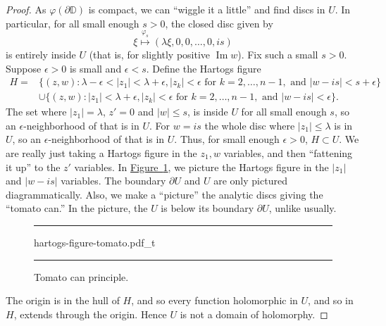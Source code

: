\documentclass[12pt,openany]{book}
\renewcommand{\Im}{\operatorname{Im}}
\newcommand{\sabs}[1]{\lvert {#1} \rvert}
\newcommand{\D}{{\mathbb{D}}}
\theoremstyle{plain}
\theoremstyle{remark}
\theoremstyle{definition}
\newenvironment{myfig}{%
\begin{figure}[h!t]
\noindent\rule{\textwidth}{0.5pt}\vspace{12pt}\par\centering}%
{\par\noindent\rule{\textwidth}{0.5pt}
\end{figure}}
\theoremstyle{exercise}
\theoremstyle{example}
\newcommand{\figureref}[1]{\hyperref[#1]{Figure~\ref*{#1}}}
\begin{document}
\begin{proof}
As $\varphi(\partial \D)$ is compact, we can ``wiggle it a little'' and
find discs in $U$.  In particular, for all small enough $s > 0$,
the closed disc given by
\begin{equation*}
\xi \overset{\varphi_s}{\mapsto} (\lambda \xi, 0, 0, \ldots, 0, i s)
\end{equation*}
is entirely inside $U$ (that is, for slightly positive $\Im w$).
Fix such a small $s > 0$.
Suppose $\epsilon > 0$ is small and $\epsilon < s$.
Define the Hartogs figure
\begin{equation*}
\begin{split}
H =
& \bigl\{ (z,w) : \lambda - \epsilon < \sabs{z_1} < \lambda + \epsilon,
\sabs{z_k} < \epsilon \text{ for } k=2,\ldots,n-1, \text{ and }
\sabs{w-is} < s+\epsilon \bigr\}
\\
&
\cup
\bigl\{ (z,w) : \sabs{z_1} < \lambda + \epsilon,
\sabs{z_k} < \epsilon \text{ for } k=2,\ldots,n-1, \text{ and }
\sabs{w-is} < \epsilon \bigr\} .
\end{split}
\end{equation*}
The set where $\sabs{z_1} = \lambda$, $z' = 0$
and $\sabs{w} \leq s$, is inside $U$ for all small enough $s$, so
an $\epsilon$-neighborhood of that is in $U$.
For
$w = is$ the whole disc where $\sabs{z_1} \leq \lambda$ is in $U$,
so an $\epsilon$-neighborhood of that is in $U$.
Thus, for small enough $\epsilon >0$, $H \subset U$.
We are really just taking a Hartogs figure in the $z_1,w$ variables, and then
``fattening it up'' to the $z'$ variables.
In \figureref{fig:hartogs-figure-tomato}, we picture the Hartogs figure in the $\sabs{z_1}$ and $\sabs{w-is}$
variables.  The boundary $\partial U$ and $U$ are only pictured diagrammatically.
Also, we make a ``picture'' the analytic discs giving the ``tomato can.''
In the picture, the $U$ is below its boundary $\partial U$, unlike usually.

\begin{myfig}
{hartogs-figure-tomato.pdf_t}
\caption{Tomato can principle.\label{fig:hartogs-figure-tomato}}
\end{myfig}

The origin is in the hull of $H$, and so
every function holomorphic in $U$, and so in $H$, extends through the origin.
Hence $U$ is not a domain of holomorphy.
\end{proof}
\end{document}
